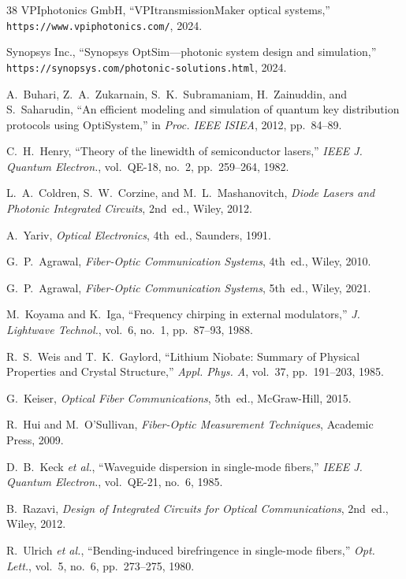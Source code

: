 \documentclass[11pt,a4paper]{article}
\begin{document}
\begin{thebibliography}{38}
VPIphotonics GmbH, ``VPItransmissionMaker optical systems,''
\texttt{https://www.vpiphotonics.com/}, 2024.

Synopsys Inc., ``Synopsys OptSim---photonic system design and
simulation,'' \texttt{https://synopsys.com/photonic-solutions.html},
2024.

A.~Buhari, Z.~A.~Zukarnain, S.~K.~Subramaniam, H.~Zainuddin,
and S.~Saharudin, ``An efficient modeling and simulation of quantum
key distribution protocols using OptiSystem,'' in \textit{Proc. IEEE
ISIEA}, 2012, pp.~84--89.

C.~H.~Henry, ``Theory of the linewidth of semiconductor lasers,''
\textit{IEEE J. Quantum Electron.}, vol.~QE-18, no.~2, pp.~259--264, 1982.

L.~A.~Coldren, S.~W.~Corzine, and M.~L.~Mashanovitch,
\textit{Diode Lasers and Photonic Integrated Circuits}, 2nd~ed.,
Wiley, 2012.

A.~Yariv, \textit{Optical Electronics}, 4th~ed., Saunders, 1991.

G.~P.~Agrawal, \textit{Fiber-Optic Communication Systems}, 4th~ed.,
Wiley, 2010.

G.~P.~Agrawal, \textit{Fiber-Optic Communication Systems}, 5th~ed.,
Wiley, 2021.

M.~Koyama and K.~Iga, ``Frequency chirping in external modulators,''
\textit{J. Lightwave Technol.}, vol.~6, no.~1, pp.~87--93, 1988.

R.~S.~Weis and T.~K.~Gaylord, ``Lithium Niobate: Summary of Physical
Properties and Crystal Structure,'' \textit{Appl. Phys. A}, vol.~37,
pp.~191--203, 1985.

G.~Keiser, \textit{Optical Fiber Communications}, 5th~ed., McGraw-Hill,
2015.

R.~Hui and M.~O'Sullivan, \textit{Fiber-Optic Measurement Techniques},
Academic Press, 2009.

D.~B.~Keck \textit{et al.}, ``Waveguide dispersion in single-mode fibers,''
\textit{IEEE J. Quantum Electron.}, vol.~QE-21, no.~6, 1985.

B.~Razavi, \textit{Design of Integrated Circuits for Optical
Communications}, 2nd~ed., Wiley, 2012.

R.~Ulrich \textit{et al.}, ``Bending-induced birefringence in single-mode
fibers,'' \textit{Opt. Lett.}, vol.~5, no.~6, pp.~273--275, 1980.


\end{thebibliography}
\end{document}
